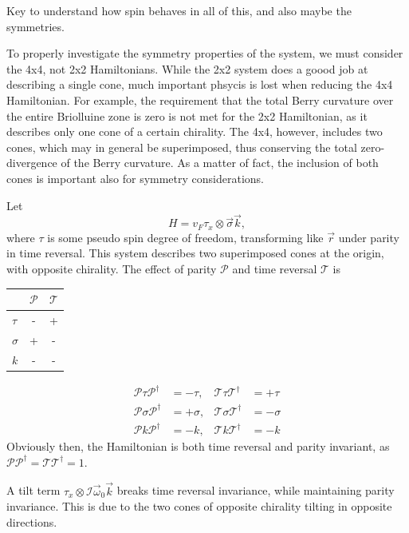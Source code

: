 Key to understand how spin behaves in all of this, and also maybe the symmetries.

To properly investigate the symmetry properties of the system, we must consider the 4x4, not 2x2 Hamiltonians.
While the 2x2 system does a goood job at describing a single cone, much important phsycis is lost when reducing the 4x4 Hamiltonian.
For example, the requirement that the total Berry curvature over the entire Briolluine zone is zero is not met for the 2x2 Hamiltonian, as it describes only one cone of a certain chirality.
The 4x4, however, includes two cones, which may in general be superimposed, thus conserving the total zero-divergence of the Berry curvature.
As a matter of fact, the inclusion of both cones is important also for symmetry considerations.

Let
\[
  H = v_{F} \tau _{x} \otimes \vec{\sigma} \vec{k},
\]
where \(\tau \) is some pseudo spin degree of freedom, transforming like \(\vec{r}\) under parity in time reversal.
This system describes two superimposed cones at the origin, with opposite chirality.
The effect of parity \(\mathcal{P}\) and time reversal \(\mathcal{T}\) is
\begin{table}[h]
  \centering
  \begin{tabular}{lcc}
    & \(\mathcal{P}\) & \(\mathcal{T}\)\\
    \hline
    \(\tau \) & - & +\\
    \(\sigma \) & + & -\\
    \(k\) & - & -
  \end{tabular}
\end{table}
\begin{equation}
  \label{eq:111}
  \begin{aligned}
    \mathcal{P} \tau \mathcal{P}^{\dagger} &= -\tau, & \mathcal{T} \tau \mathcal{T}^{\dagger} &= +\tau\\
    \mathcal{P} \sigma  \mathcal{P}^{\dagger} &= + \sigma,  & \mathcal{T} \sigma  \mathcal{T}^{\dagger} &= -\sigma \\
    \mathcal{P} k \mathcal{P}^{\dagger} &= -k, & \mathcal{T} k \mathcal{T}^{\dagger} &= -k
  \end{aligned}
\end{equation}
Obviously then, the Hamiltonian is both time reversal and parity invariant, as \(\mathcal{P} \mathcal{P}^{\dagger} = \mathcal{T} \mathcal{T}^{\dagger} = 1\).

A tilt term \(\tau _{x} \otimes \mathcal{I} \vec{\omega} _{0} \vec{k}\) breaks time reversal invariance, while maintaining parity invariance.
This is due to the two cones of opposite chirality tilting in opposite directions.

